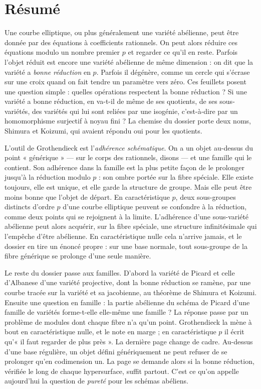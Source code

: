 \documentclass[11pt,a4paper]{article}
\begin{document}
\section*{Résumé}

\begin{resume}
Une courbe elliptique, ou plus généralement une variété abélienne, peut être
donnée par des équations à coefficients rationnels. On peut alors réduire ces
équations modulo un nombre premier $p$ et regarder ce qu'il en reste. Parfois
l'objet réduit est encore une variété abélienne de même dimension : on dit que
la variété a \emph{bonne réduction} en $p$. Parfois il dégénère, comme un
cercle qui s'écrase sur une croix quand on fait tendre un paramètre vers zéro.
Ces feuillets posent une question simple : quelles opérations respectent la
bonne réduction ? Si une variété a bonne réduction, en va-t-il de même de ses
quotients, de ses sous-variétés, des variétés qui lui sont reliées par une
isogénie, c'est-à-dire par un homomorphisme surjectif à noyau fini ? La
chemise du dossier porte deux noms, Shimura et Koizumi, qui avaient répondu
oui pour les quotients.

L'outil de Grothendieck est l'\emph{adhérence schématique}. On a un objet
au-dessus du point « générique » --- sur le corps des rationnels, disons --- et
une famille qui le contient. Son adhérence dans la famille est la plus petite
façon de le prolonger jusqu'à la réduction modulo $p$ : son ombre portée sur la
fibre spéciale. Elle existe toujours, elle est unique, et elle garde la
structure de groupe. Mais elle peut être moins bonne que l'objet de départ. En
caractéristique $p$, deux sous-groupes distincts d'ordre $p$ d'une courbe
elliptique peuvent se confondre à la réduction, comme deux points qui se
rejoignent à la limite. L'adhérence d'une sous-variété abélienne peut alors
acquérir, sur la fibre spéciale, une structure infinitésimale qui l'empêche
d'être abélienne. En caractéristique nulle cela n'arrive jamais, et le dossier
en tire un énoncé propre : sur une base normale, tout sous-groupe de la fibre
générique se prolonge d'une seule manière.

Le reste du dossier passe aux familles. D'abord la variété de Picard et celle
d'Albanese d'une variété projective, dont la bonne réduction se ramène, par
une courbe tracée sur la variété et sa jacobienne, au théorème de Shimura et
Koizumi. Ensuite une question en famille : la partie abélienne du schéma de
Picard d'une famille de variétés forme-t-elle elle-même une famille ? La
réponse passe par un problème de modules dont chaque fibre n'a qu'un point.
Grothendieck la mène à bout en caractéristique nulle, et le note en marge ;
en caractéristique $p$ il écrit qu'« il faut regarder de plus près ». La
dernière page change de cadre. Au-dessus d'une base régulière, un objet défini
génériquement ne peut refuser de se prolonger qu'en codimension un. La page se
demande alors si la bonne réduction, vérifiée le long de chaque hypersurface,
suffit partout. C'est ce qu'on appelle aujourd'hui la question de
\emph{pureté} pour les schémas abéliens.


\end{resume}
\end{document}
